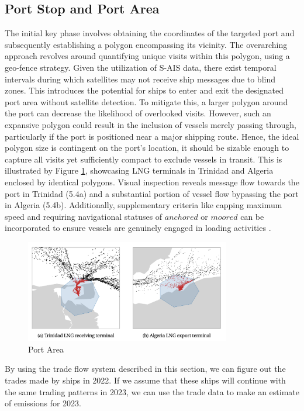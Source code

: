 \subsection{Port Stop and Port Area}

The initial key phase involves obtaining the coordinates of the targeted port and subsequently establishing a polygon encompassing its vicinity. 
The overarching approach revolves around quantifying unique visits within this polygon, using a geo-fence strategy. 
Given the utilization of S-AIS data, there exist temporal intervals during which satellites may not receive ship messages due to blind zones. 
This introduces the potential for ships to enter and exit the designated port area without satellite detection. 
To mitigate this, a larger polygon around the port can decrease the likelihood of overlooked visits. However, such an expansive polygon could result in the inclusion of vessels merely passing through, particularly if the port is positioned near a major shipping route. 
Hence, the ideal polygon size is contingent on the port's location, it should be sizable enough to capture all visits yet sufficiently compact to exclude vessels in transit. 
This is illustrated by Figure \ref{port_area}, showcasing LNG terminals in Trinidad and Algeria enclosed by identical polygons.
Visual inspection reveals message flow towards the port in Trinidad (5.4a) and a substantial portion of vessel flow bypassing the port in Algeria (5.4b). 
Additionally, supplementary criteria like capping maximum speed and requiring navigational statuses of $anchored$ or $moored$ can be incorporated to ensure vessels are genuinely engaged in loading activities \autocite{halden2019estimation}.

\begin{figure}[h]
    \centering
    \includegraphics[width=0.8\textwidth]{images/port_area.png}
    \caption{Port Area}
    \label{port_area}
\end{figure}

By using the trade flow system described in this section, we can figure out the trades made by ships in 2022. 
If we assume that these ships will continue with the same trading patterns in 2023, we can use the trade data to make an estimate of emissions for 2023.